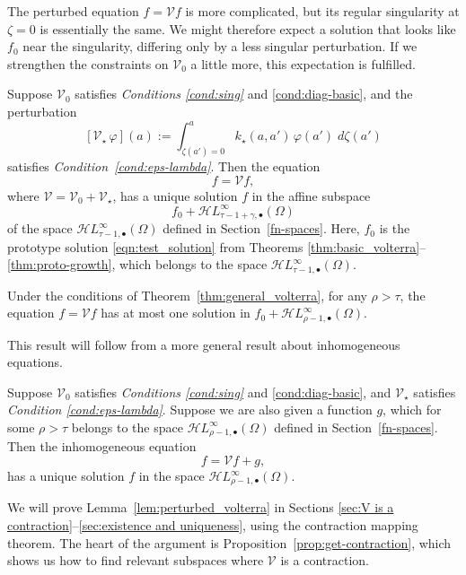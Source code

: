 \documentclass[final]{siamart220329}
\newcommand{\singexp}[2]{\mathcal{H}L^\infty_{#1, #2}}
\newcommand{\singexpalg}[1]{\singexp{#1}{\bullet}}
\newcommand{\volterra}{\mathcal{V}}
\newcommand{\hardpart}{\mathcal{V}_0}
\newcommand{\softpart}{\mathcal{V}_\star}
\newcommand{\softker}{k_\star}
\newcommand{\solproto}{f_0}
\newcommand{\domain}{\Omega}
\newenvironment{revtwo}{\color{revred}}{\color{black}}
\newcommand{\revtwotext}[1]{\textcolor{revred}{#1}}
\newenvironment{revtwo}{}{}
\newcommand{\revtwotext}[1]{#1}
\begin{document}
The perturbed equation $f = \volterra f$ is more complicated, but its regular singularity at $\zeta = 0$ is essentially the same. We might therefore expect a solution that looks like $\solproto$ near the singularity, differing only by a less singular perturbation. If we strengthen the constraints on $\hardpart$ a little more, this expectation is fulfilled.
\begin{theorem}\label{thm:general_volterra}
Suppose $\hardpart$ satisfies {\em Conditions \eqref{cond:sing}} and \eqref{cond:diag-basic}, and \begin{revtwo}the perturbation
\[ [\softpart\,\varphi](a) := \int_{\zeta(a') = 0}^a \softker(a, a')\,\varphi(a')\;d\zeta(a') \]
\end{revtwo}
satisfies {\em Condition~\eqref{cond:eps-lambda}}. Then the equation
\[ f = \volterra f, \]
\revtwotext{where $\volterra = \hardpart + \softpart$,} has a unique solution $f$ in the affine subspace
\[ f_0 + \singexpalg{\tau-1+\gamma}(\Omega) \]
of the space $\singexpalg{\tau-1}(\Omega)$ defined in Section~\ref{fn-spaces}. Here, $f_0$ is the prototype solution \eqref{eqn:test_solution} from Theorems \ref{thm:basic_volterra}--\ref{thm:proto-growth}, which belongs to the space $\singexpalg{\tau-1}(\domain)$.
\end{theorem}
\begin{corollary}\label{cor:expand_uniq}
Under the conditions of Theorem~\ref{thm:general_volterra}, for any $\rho > \tau$, the equation $f = \volterra f$ has at most one solution in $f_0 + \singexpalg{\rho-1}(\Omega)$. 
\end{corollary}
This result will follow from a more general result about inhomogeneous equations.
\begin{lemma}\label{lem:perturbed_volterra}
Suppose $\hardpart$ satisfies {\em Conditions \eqref{cond:sing}} and \eqref{cond:diag-basic}, and $\softpart$ satisfies {\em Condition \eqref{cond:eps-lambda}}. Suppose we are also given a function $g$, which for some $\rho > \tau$ belongs to the space $\singexpalg{\rho-1}(\Omega)$ defined in Section~\ref{fn-spaces}. Then the inhomogeneous equation
\[ f = \volterra f + g, \]
has a unique solution $f$ in the space $\singexpalg{\rho-1}(\Omega)$.
\end{lemma}
We will prove Lemma~\ref{lem:perturbed_volterra} in Sections \ref{sec:V is a contraction}--\ref{sec:existence and uniqueness}, using the contraction mapping theorem. The heart of the argument is Proposition~\ref{prop:get-contraction}, which shows us how to find relevant subspaces where $\volterra$ is a contraction.
\end{document}
